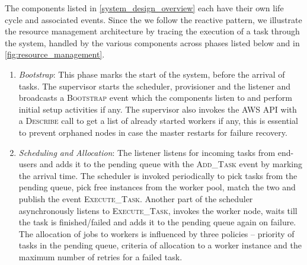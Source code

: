 \documentclass[a4paper]{IEEEtran}
\begin{document}
The components listed in \autoref{system_design_overview} each have their own life cycle and associated events.
Since the we follow the reactive pattern, we illustrate the resource management architecture by tracing the execution
 of a task through the system, handled by the various components across phases listed below and in \autoref{fig:resource_management}.

\begin{enumerate}
  \item \emph{Bootstrap}: This phase marks the start of the system, before the arrival of tasks. The supervisor starts the scheduler, provisioner and the listener and 
  broadcasts a \textsc{Bootstrap} event which the components listen to and perform initial setup activities if any. The supervisor
  also invokes the AWS API with a \textsc{Describe} call to get a list of already started workers if any, this is essential to prevent
  orphaned nodes in case the master restarts for failure recovery.

  \item \emph{Scheduling and Allocation}: The listener listens for incoming tasks from end-users and adds it to the pending queue
  with the \textsc{Add\_Task} event by marking the arrival time. The scheduler is invoked periodically to pick
  tasks from the pending queue, pick free instances from the worker pool, match the two and publish the event \textsc{Execute\_Task}.
  Another part of the scheduler asynchronously listens to \textsc{Execute\_Task}, invokes the worker node, waits till 
  the task is finished/failed and adds it to the pending queue again on failure. The allocation of jobs to workers
  is influenced by three policies -- priority of tasks in the pending queue, criteria of allocation to a worker instance and
  the maximum number of retries for a failed task.


\end{enumerate}
\end{document}

